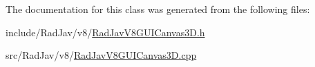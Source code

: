 The documentation for this class was generated from the following files\+:\begin{DoxyCompactItemize}
\item 
include/\+Rad\+Jav/v8/\mbox{\hyperlink{_rad_jav_v8_g_u_i_canvas3_d_8h}{Rad\+Jav\+V8\+G\+U\+I\+Canvas3\+D.\+h}}\item 
src/\+Rad\+Jav/v8/\mbox{\hyperlink{_rad_jav_v8_g_u_i_canvas3_d_8cpp}{Rad\+Jav\+V8\+G\+U\+I\+Canvas3\+D.\+cpp}}\end{DoxyCompactItemize}
